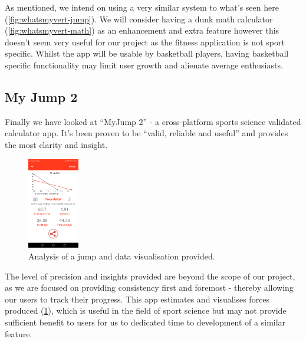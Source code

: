 As mentioned, we intend on using a very similar system to what's seen here (\cref{fig:whatsmyvert-jump}).
We will consider having a dunk math calculator (\cref{fig:whatsmyvert-math}) as an enhancement and extra feature however this doesn't seem
very useful for our project as the fitness application is not sport specific. Whilst the app will be usable
by basketball players, having basketball specific functionality may limit user growth and alienate
average enthusiasts.

\subsection{My Jump 2}
\label{research:my-jump}
Finally we have looked at ``MyJump 2'' - a cross-platform sports science validated calculator app.
It's been proven to be ``valid, reliable and useful'' \cite{myjump-proof} and provides
the most clarity and insight.
\begin{figure}[H]
	\centering
	\includegraphics[width=0.2\textwidth]{graphics/myjump2/jump-forces.png}
	\caption{Analysis of a jump and data visualisation provided.}
	\label{fig:myjump2-analysis}	
\end{figure}
The level of precision and insights provided are beyond the scope of our project, as we are focused
on providing consistency first and foremost - thereby allowing our users to track their progress.
This app estimates and visualises forces produced (\cref{fig:myjump2-analysis}), which is useful
in the field of sport science but may not provide sufficient benefit to users for us to dedicated
time to development of a similar feature.